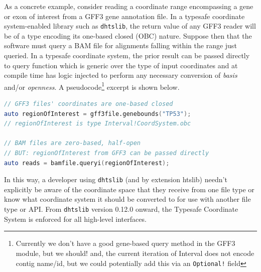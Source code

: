 \documentclass[12pt]{article}
\begin{document}
As a concrete example, consider reading a coordinate range encompassing a gene or exon of interest from a GFF3 gene annotation file. In a typesafe coordinate system-enabled library such as \texttt{dhtslib}, the return value of any GFF3 reader will be of a type encoding its one-based closed (OBC) nature. Suppose then that the software must query a BAM file for alignments falling within the range just queried. In a typesafe coordinate system, the prior result can be passed directly to query function which is generic over the type of input coordinates and at compile time has logic injected to perform any necessary conversion of \textit{basis} and/or \textit{openness}. A pseudocode\footnote{Currently we don't have a good gene-based query method in the GFF3 module, but we should! and, the current iteration of Interval does not encode contig name/id, but we could potentially add this via an \texttt{Optional!} field} excerpt is shown below.\\

\begin{lstlisting}[language=D,frame=single,basicstyle=\ttfamily\small]
// GFF3 files' coordinates are one-based closed
auto regionOfInterest = gff3file.genebounds("TP53");
// regionOfInterest is type Interval!CoordSystem.obc

// BAM files are zero-based, half-open
// BUT: regionOfInterest from GFF3 can be passed directly
auto reads = bamfile.queryi(regionOfInterest);
\end{lstlisting}


In this way, a developer using \texttt{dhtslib} (and by extension htslib) needn't explicitly be aware of the coordinate space that they receive from one file type or know what coordinate system it should be converted to for use with another file type or API. From \texttt{dhtslib} version 0.12.0 onward, the Typesafe Coordinate System is enforced for all high-level interfaces.
\end{document}
